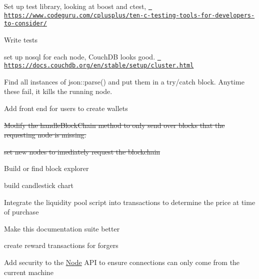 
\begin{DoxyItemize}
\item Set up test library, looking at boost and ctest, \href{https://www.codeguru.com/cplusplus/ten-c-testing-tools-for-developers-to-consider/}{\texttt{ https\+://www.\+codeguru.\+com/cplusplus/ten-\/c-\/testing-\/tools-\/for-\/developers-\/to-\/consider/}}
\item Write tests
\item set up nosql for each node, Couch\+DB looks good. \href{https://docs.couchdb.org/en/stable/setup/cluster.html}{\texttt{ https\+://docs.\+couchdb.\+org/en/stable/setup/cluster.\+html}}
\item Find all instances of json\+::parse() and put them in a try/catch block. Anytime these fail, it kills the running node.
\item Add front end for users to create wallets
\item \sout{Modify the handle\+Block\+Chain method to only send over blocks that the requesting node is missing.}
\item \sout{set new nodes to imediately request the blockchain}
\item Build or find block explorer
\item build candlestick chart
\item Integrate the liquidity pool script into transactions to determine the price at time of purchase
\item Make this documentation suite better
\item create reward transactions for forgers
\item Add security to the \mbox{\hyperlink{class_node}{Node}} API to ensure connections can only come from the current machine 
\end{DoxyItemize}